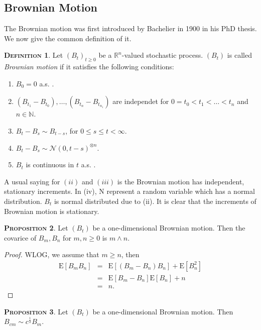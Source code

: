 \documentclass[a4paper, twoside, 11pt]{article}
\theoremstyle{definition}
\newtheorem{definition}{\scshape Definition}[section]
\newtheorem{proposition}[definition]{\scshape Proposition}
\begin{document}
\subsection{Brownian Motion}
The Brownian motion was first introduced by Bachelier in 1900 in his PhD thesis. We now give the common definition of it.
\begin{definition}
Let $(B_t)_{t\ge0}$ be a $\mathbb{R}^{n}$-valued stochastic process. $(B_t)$ is called \emph{Brownian motion} if it satisfies the following conditions:
\begin{enumerate}[topsep=0pt, itemsep=-1ex, partopsep=1ex, parsep=1ex, label=(\roman*)]
  \item $B_0 = 0 $ a.s. .
  \item $(B_{t_1} - B_{t_0}),\dots,(B_{t_n} - B_{t_{n_1}})$ are independet for $0=t_0<t_1<\dots<t_n$ and $n \in \mathbb{N}$.
  \item $B_t - B_s \sim B_{t-s}$, for $0 \le s \le t < \infty$.
  \item $B_t - B_s \sim \mathcal{N}(0, t-s)^{\otimes n}$.
  \item $B_t$ is continuous in $t$ a.s. .
\end{enumerate}
\end{definition}
A usual saying for $(ii)$ and $(iii)$ is the Brownian motion has independent, stationary increments. In (iv), $\mathrm{N}$ represent a random variable which has a normal distribution. $B_t$ is normal distributed due to (ii). It is clear that the increments of Brownian motion is stationary.

\begin{proposition}
  Let $(B_t)$ be a one-dimensional Brownian motion. Then the covarice of $B_m, B_n$ for $m, n \ge 0$ is $m \wedge n $.
\end{proposition}

\begin{proof}
  WLOG, we assume that $m \ge n$, then
  \begin{eqnarray*}
	\mathrm{E}[B_mB_n] &=& \mathrm{E}[(B_m - B_n)B_n] + \mathrm{E}[B_n^2]\\
	&=& \mathrm{E}[B_m - B_n]\mathrm{E}[B_n] + n\\
	&=& n .
  \end{eqnarray*}
  \label{sec:cor}
\end{proof}

\begin{proposition}
  Let $(B_t)$ be a one-dimensional Brownian motion. Then $B_{cm} \sim c^{\frac{1}{2}}B_m$.
\end{proposition}
\end{document}
